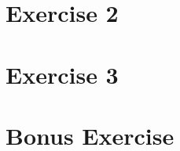 \documentclass[a4paper, 12pt]{article}
\begin{document}
\section{Exercise 2}




\section{Exercise 3}



%
%



\section{Bonus Exercise}



\end{document}
